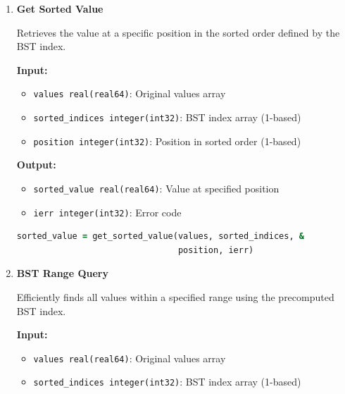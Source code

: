 \begin{enumerate}
\begin{enumerate}
            \item \textbf{Get Sorted Value}
                  
                  Retrieves the value at a specific position in the sorted order defined
                  by the BST index.
                  
                  \textbf{Input:}
                  \begin{itemize}
                    \item \texttt{values real(real64)}: Original values array
                          
                    \item \texttt{sorted\_indices integer(int32)}: BST index array (1-based)
                          
                    \item \texttt{position integer(int32)}: Position in sorted order (1-based)
                  \end{itemize}
                  \textbf{Output:}
                  \begin{itemize}
                    \item \texttt{sorted\_value real(real64)}: Value at specified position
                          
                    \item \texttt{ierr integer(int32)}: Error code
                  \end{itemize}
                  \begin{lstlisting}[language=Fortran]
sorted_value = get_sorted_value(values, sorted_indices, &
                                position, ierr)
                  \end{lstlisting}
                  
            \item \textbf{BST Range Query}
                  
                  Efficiently finds all values within a specified range using the precomputed
                  BST index.
                  
                  \textbf{Input:}
                  \begin{itemize}
                    \item \texttt{values real(real64)}: Original values array
                          
                    \item \texttt{sorted\_indices integer(int32)}: BST index array (1-based)
                          

\end{itemize}
\end{enumerate}
\end{enumerate}
